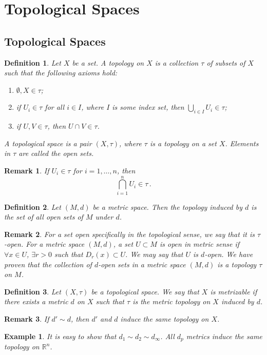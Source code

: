 \documentclass{article}
\theoremstyle{plain}\theoremheaderfont{\normalfont\itshape}\theorembodyfont{\rmfamily}\theoremseparator{.}\newtheorem*{rem}{Remark}\newtheorem*{ex}{Example}\newtheorem*{proof}{Proof}\newtheorem*{altp}{Alternative proof}
\theoremstyle{plain}\theoremheaderfont{\normalfont\bfseries}\theorembodyfont{\rmfamily}\theoremseparator{.}\newtheorem{thm}{Theorem}[section]\newtheorem{lem}[thm]{Lemma}\newtheorem{prop}[thm]{Proposition}\newtheorem*{cor}{Corollary}\newtheorem{defn}[thm]{Definition}\newtheorem{clm}[thm]{Claim}\newtheorem{clminproof}{Claim}
\theoremstyle{break}\theoremheaderfont{\normalfont\itshape}\theorembodyfont{\rmfamily}\theoremseparator{.\medskip}\newtheorem*{proofskip}{Proof}\newtheorem*{exs}{Examples}\newtheorem*{rems}{Remarks}
\theoremstyle{break}\theoremheaderfont{\normalfont\bfseries}\theorembodyfont{\rmfamily}\theoremseparator{.\medskip}\newtheorem{lemskip}[thm]{Lemma}\newtheorem{defnskip}[thm]{Definition}\newtheorem{propskip}[thm]{Proposition}\newtheorem{thmskip}[thm]{Theorem}
\begin{document}
    \section{Topological Spaces}
    \subsection{Topological Spaces}
    \begin{defn}
        Let \(X\) be a set. A \textit{topology} on \(X\) is a collection \(\tau\) of subsets of \(X\) such that the following axioms hold:
        \begin{enumerate}[topsep=0pt]
            \item \(\emptyset,X\in\tau\);
            \item if \(U_i\in\tau\) for all \(i\in I\), where \(I\) is some index set, then \(\bigcup_{i\in I}U_i\in\tau\);
            \item if \(U,V\in\tau\), then \(U\cap V\in\tau\).
        \end{enumerate}
        A \textit{topological space} is a pair \((X,\tau)\), where \(\tau\) is a topology on a set \(X\). Elements in \(\tau\) are called the \textit{open sets}.
    \end{defn}
    \begin{rem}
        If \(U_i\in\tau\) for \(i=1,\dots,n\), then
        \[\bigcap_{i=1}^{n}U_i\in\tau\,.\]
    \end{rem}

    \begin{defn}
        Let \((M,d)\) be a metric space. Then the topology \textit{induced} by \(d\) is the set of all open sets of \(M\) under \(d\).
    \end{defn}
    \begin{rem}
        For a set open specifically in the topological sense, we say that it is \(\tau\)-open. For a metric space \((M,d)\), a set \(U\subset M\) is open in metric sense if \(\forall x\in U\), \(\exists r>0\) such that \(D_r(x)\subset U\). We may say that \(U\) is \(d\)-open. We have proven that the collection of \(d\)-open sets in a metric space \((M,d)\) is a topology \(\tau\) on \(M\).
    \end{rem}

    \begin{defn}
        Let \((X,\tau)\) be a topological space. We say that \(X\) is \textit{metrizable} if there exists a metric \(d\) on \(X\) such that \(\tau\) is the metric topology on \(X\) induced by \(d\).
    \end{defn}
    \begin{rem}
        If \(d'\sim d\), then \(d'\) and \(d\) induce the same topology on \(X\).
    \end{rem}
    \begin{ex}
        It is easy to show that \(d_1\sim d_2\sim d_\infty\). All \(d_p\) metrics induce the same topology on \(\mathbb{R}^n\).
    \end{ex}
\end{document}
